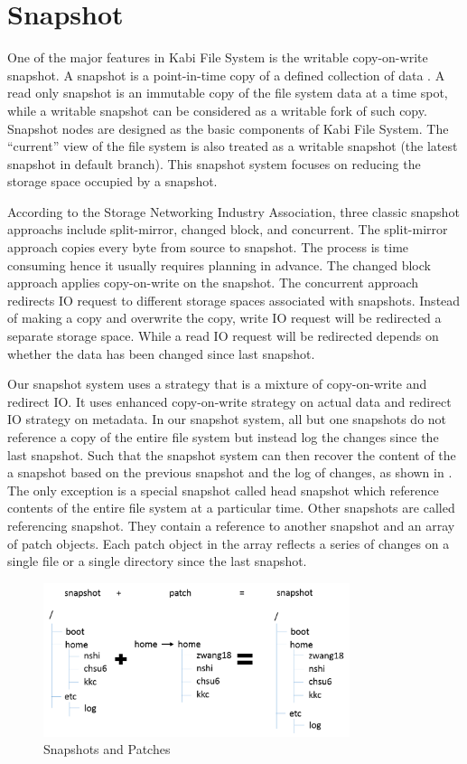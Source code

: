 \chapter{Snapshot}
\label{chap:snapshot}

    One of the major features in Kabi File System is the writable copy-on-write snapshot. A snapshot is a point-in-time copy of a defined collection of data \cite{snapshot_def}. A read only snapshot is an immutable copy of the file system data at a time spot, while a writable snapshot can be considered as a writable fork of such copy. Snapshot nodes are designed as the basic components of Kabi File System. The ``current'' view of the file system is also treated as a writable snapshot (the latest snapshot in default branch). This snapshot system focuses on reducing the storage space occupied by a snapshot.

    According to the Storage Networking Industry Association, three classic snapshot approachs include split-mirror, changed block, and concurrent.\cite{snapshot_types} The split-mirror approach copies every byte from source to snapshot. The process is time consuming hence it usually requires planning in advance. The changed block approach applies copy-on-write on the snapshot. The concurrent approach redirects IO request to different storage spaces associated with snapshots. Instead of making a copy and overwrite the copy, write IO request will be redirected a separate storage space. While a read IO request will be redirected depends on whether the data has been changed since last snapshot.

    Our snapshot system uses a strategy that is a mixture of copy-on-write and redirect IO. It uses enhanced copy-on-write strategy on actual data and redirect IO strategy on metadata. In our snapshot system, all but one snapshots do not reference a copy of the entire file system but instead log the changes since the last snapshot. Such that the snapshot system can then recover the content of the a snapshot based on the previous snapshot and the log of changes, as shown in . The only exception is a special snapshot called head snapshot which reference contents of the entire file system at a particular time. Other snapshots are called referencing snapshot. They contain a reference to another snapshot and an array of patch objects. Each patch object in the array reflects a series of changes on a single file or a single directory since the last snapshot.

\begin{figure}[t]
\centering
\includegraphics[width=0.8\textwidth]{Chapter-4/figs/fig23.png}
\caption{Snapshots and Patches}
\label{fig:snapshot_patch}
\end{figure}

